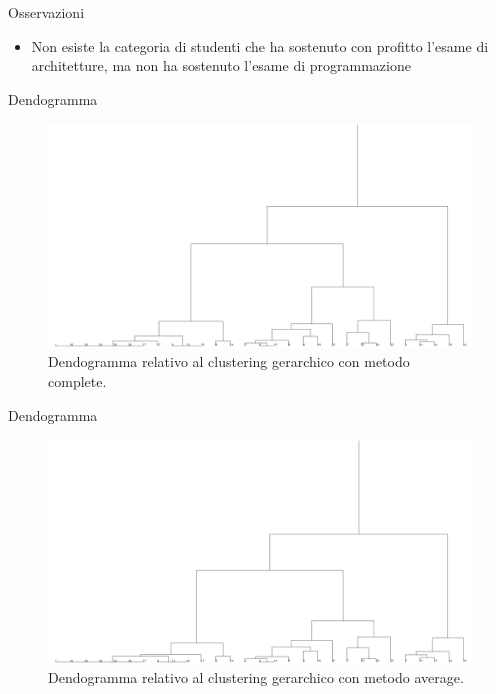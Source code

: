 \documentclass{beamer}
\begin{document}
\begin{frame}{Osservazioni}
  \begin{itemize}
    \item Non esiste la categoria di studenti che ha sostenuto con profitto l’esame di architetture, ma non ha sostenuto l’esame di programmazione
  \end{itemize}
\end{frame}

\begin{frame}{Dendogramma}
  \begin{figure}[bt]
    \includegraphics[width=\textwidth]{../img/hierarchical-complete.png}
    \caption{Dendogramma relativo al clustering gerarchico con metodo complete.}
  \end{figure}
\end{frame}

\begin{frame}{Dendogramma}
  \begin{figure}[bt]
    \includegraphics[width=\textwidth]{../img/hierarchical-average.png}
    \caption{Dendogramma relativo al clustering gerarchico con metodo average.}
  \end{figure}
\end{frame}
\end{document}
